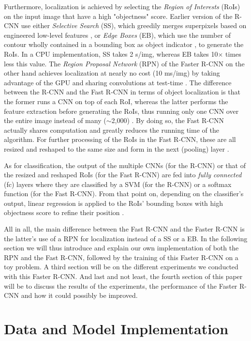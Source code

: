 \documentclass[a4paper]{article}
\begin{document}
Furthermore, localization is achieved by selecting the \emph{Region of Interests} (RoIs) on the input image that have a high "objectness" score. Earlier version of the R-CNN use either \emph{Selective Search} (SS), which greedily merges superpixels based on engineered low-level features \cite{ss}, or \emph{Edge Boxes} (EB), which use the number of contour wholly contained in a bounding box as object indicator \cite{eb}, to generate the RoIs. In a CPU implementation, SS takes 2 s/img, whereas EB takes 10$\times$ times less this value. The \emph{Region Proposal Network} (RPN) of the Faster R-CNN on the other hand achieves localization at nearly no cost (10 ms/img) by taking advantage of the GPU and sharing convolutions at test-time \cite{fasterrcnn}. The difference between the R-CNN and the Fast R-CNN in terms of object localization is that the former runs a CNN on top of each RoI, whereas the latter performs the feature extraction before generating the RoIs, thus running only one CNN over the entire image instead of many ($\sim$2,000) \cite{fastrcnn}. By doing so, the Fast R-CNN actually shares computation and greatly reduces the running time of the algorithm. For further processing of the RoIs in the Fast R-CNN, these are all resized and reshaped to the same size and form in the next (pooling) layer \cite{fastrcnn}.

As for classification, the output of the multiple CNNs (for the R-CNN) or that of the resized and reshaped RoIs (for the Fast R-CNN) are fed into \emph{fully connected} (fc) layers where they are classified by a SVM (for the R-CNN) or a softmax function (for the Fast R-CNN). From that point on, depending on the classifier's output, linear regression is applied to the RoIs' bounding boxes with high objectness score to refine their position \cite{fastrcnn}.

All in all, the main difference between the Fast R-CNN and the Faster R-CNN is the latter's use of a RPN for localization instead of a SS or a EB. In the following section we will thus introduce and explain our own implementation of both the RPN and the Fast R-CNN, followed by the training of this Faster R-CNN on a toy problem. A third section will be on the different experiments we conducted with this Faster R-CNN. And last and not least, the fourth section of this paper will be to discuss the results of the experiments, the performance of the Faster R-CNN and how it could possibly be improved.

\section{Data and Model Implementation}
\end{document}
